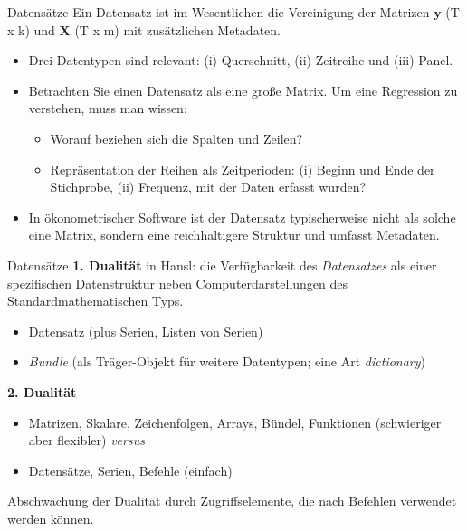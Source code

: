\documentclass{beamer}[11pt]
\begin{document}
\begin{frame}{Datensätze}
	Ein Datensatz ist im Wesentlichen die Vereinigung der Matrizen $\textbf{y}$ (T x k) und $\textbf{X}$ (T x m) mit zusätzlichen Metadaten.
	\begin{itemize}
		\item Drei Datentypen sind relevant: (i) Querschnitt, (ii) Zeitreihe und (iii) Panel.
		\item Betrachten Sie einen Datensatz als eine große Matrix. Um eine Regression zu verstehen, muss man wissen:
		      \begin{itemize}
			      \item Worauf beziehen sich die Spalten und Zeilen?
			      \item Repräsentation der Reihen als Zeitperioden: (i) Beginn und Ende der Stichprobe, (ii) Frequenz, mit der Daten erfasst wurden?
		      \end{itemize}
		\item In ökonometrischer Software ist der Datensatz typischerweise nicht als solche eine Matrix, sondern eine reichhaltigere Struktur und umfasst Metadaten. %
	\end{itemize}
\end{frame}


\begin{frame}{Datensätze}
	\textbf{1. Dualität} in Hansl: die Verfügbarkeit des \textit{Datensatzes} als einer spezifischen Datenstruktur neben Computerdarstellungen des Standardmathematischen Typs.

	\begin{itemize}
		\item Datensatz (plus Serien, Listen von Serien)
		\item \textit{Bundle} (als Träger-Objekt für weitere Datentypen; eine Art \textit{dictionary})
	\end{itemize}

	\textbf{2. Dualität}
	\begin{itemize}
		\item Matrizen, Skalare, Zeichenfolgen, Arrays, Bündel, Funktionen (schwieriger aber flexibler) \emph{versus}
		\item Datensätze, Serien, Befehle (einfach)
	\end{itemize}

	\vspace{0.5cm}

	Abschwächung der Dualität durch \underline{Zugriffselemente}, die nach Befehlen verwendet werden können. %
\end{frame}
\end{document}
